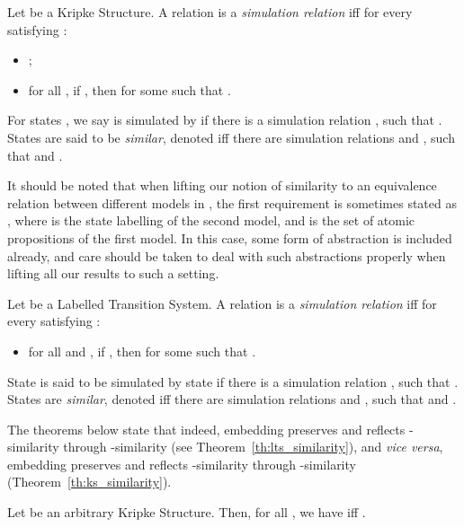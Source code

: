 \documentclass{llncs}
\begin{document}
\newcommand{\simm}{\simeq}
\begin{definition}
Let  be a Kripke Structure. A relation
 is a \emph{simulation relation} iff for every
 satisfying :
\begin{itemize}
\item ;
\item for all , if , then  for
some  such that .

\end{itemize}
For states , we say  is simulated by  if there is
a simulation relation , such that . States  are said to be \emph{similar}, denoted  iff
there are simulation relations  and , such that 
and .

\end{definition}
\begin{remark}
It should be noted that when lifting our notion of similarity to
an equivalence relation between different models in \KS,
the first requirement is sometimes stated as ,
where  is the state labelling of the second \KS model, and 
is the set of atomic propositions of the first \KS model. In this
case, some form of abstraction is included already, and care should be
taken to deal with such abstractions properly when lifting all our results to
such a setting.
\end{remark}

\begin{definition} Let  be a Labelled
Transition System. A relation  is a
\emph{simulation relation} iff for every  satisfying
:
\begin{itemize}
\item for all  and ,
if , then 
for some  such that .

\end{itemize}
State  is said to be simulated by state  if there is
a simulation relation , such that . States 
are \emph{similar}, denoted
 iff there are simulation relations  and , such
that  and .

\end{definition}

The theorems below state that indeed, embedding  preserves
and reflects \KS-similarity through \LTS-similarity (see
Theorem~\ref{th:lts_similarity}), and \emph{vice versa}, embedding
 preserves and reflects \LTS-similarity through \KS-similarity
(Theorem~\ref{th:ks_similarity}).

\begin{theorem}
\label{th:lts_similarity}
Let  be an arbitrary Kripke Structure.
Then, for all , we have
 iff .
\end{theorem}
\end{document}
